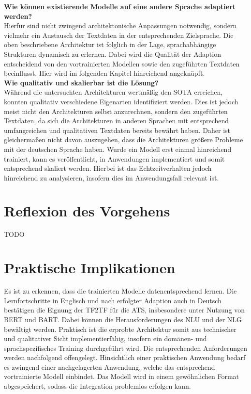 \noindent
\textbf{Wie können existierende Modelle auf eine andere Sprache adaptiert werden?}\\
\noindent
Hierfür sind nicht zwingend architektonische Anpassungen notwendig, sondern vielmehr ein Austausch der Textdaten in der entsprechenden Zielsprache. Die oben beschriebene Architektur ist folglich in der Lage, sprachabhängige Strukturen dynamisch zu erlernen. Dabei wird die Qualität der Adaption entscheidend von den vortrainierten Modellen sowie den zugeführten Textdaten beeinflusst. Hier wird im folgenden Kapitel hinreichend angeknüpft.\\

\noindent
\textbf{Wie qualitativ und skalierbar ist die Lösung?}\\
\noindent
Während die untersuchten Architekturen wertmäßig den \ac{SOTA} erreichen, konnten qualitativ verschiedene Eigenarten identifiziert werden. Dies ist jedoch meist nicht den Architekturen selbst anzurechnen, sondern den zugeführten Textdaten, da sich die Architekturen in anderen Sprachen mit entsprechend umfangreichen und qualitativen Textdaten bereits bewährt haben. Daher ist gleichermaßen nicht davon auszugehen, dass die Architekturen größere Probleme mit der deutschen Sprache haben. Wurde ein Modell erst einmal hinreichend trainiert, kann es veröffentlicht, in Anwendungen implementiert und somit entsprechend skaliert werden. Hierbei ist das Echtzeitverhalten jedoch hinreichend zu analysieren, insofern dies im Anwendungsfall relevant ist.


\section{Reflexion des Vorgehens}
\noindent
TODO
\newpage


\section{Praktische Implikationen}
\noindent
Es ist zu erkennen, dass die trainierten Modelle datenentsprechend lernen. Die Lernfortschritte in Englisch und nach erfolgter Adaption auch in Deutsch bestätigen die Eignung der \ac{TF2TF} für die \ac{ATS}, insbesondere unter Nutzung von \ac{BERT} und \ac{BART}. Dabei können die Herausforderungen des \ac{NLU} und der \ac{NLG} bewältigt werden. Praktisch ist die erprobte Architektur somit aus technischer und qualitativer Sicht implementierfähig, insofern ein domänen- und sprachspezifisches Training durchgeführt wird. Die entsprechenden Anforderungen werden nachfolgend offengelegt. Hinsichtlich einer praktischen Anwendung bedarf es zwingend einer nachgelagerten Anwendung, welche das entsprechend vortrainierte Modell einbindet. Das Modell wird in einem gewöhnlichen Format abgespeichert, sodass die Integration problemlos erfolgen kann.


